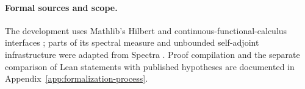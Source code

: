 \paragraph{Formal sources and scope.}
The development uses Mathlib's Hilbert and continuous-functional-calculus
interfaces \citep{mathlib2020,dedecker2025cfc}; parts of its spectral
measure and unbounded self-adjoint infrastructure were adapted from
Spectra \citep{bornemann2026spectra}.  Proof compilation and the
separate comparison of Lean statements with published hypotheses are
documented in Appendix~\ref{app:formalization-process}.
